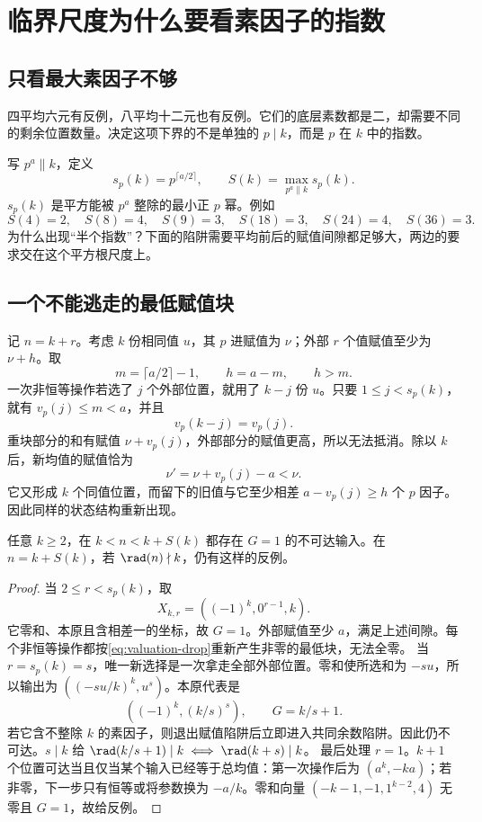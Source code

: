 \chapter{临界尺度为什么要看素因子的指数}\label{ch:lower}
\section{只看最大素因子不够}
四平均六元有反例，八平均十二元也有反例。它们的底层素数都是二，却需要不同的剩余位置数量。决定这项下界的不是单独的 $p\mid k$，而是 $p$ 在 $k$ 中的指数。

写 $p^a\parallel k$，定义
\begin{equation}\label{eq:S}
s_p(k)=p^{\lceil a/2\rceil},\qquad S(k)=\max_{p^a\parallel k}s_p(k).
\end{equation}
$s_p(k)$ 是平方能被 $p^a$ 整除的最小正 $p$ 幂。例如
\[
S(4)=2,\quad S(8)=4,\quad S(9)=3,\quad
S(18)=3,\quad S(24)=4,\quad S(36)=3.
\]
为什么出现“半个指数”？下面的陷阱需要平均前后的赋值间隙都足够大，两边的要求交在这个平方根尺度上。

\section{一个不能逃走的最低赋值块}
记 $n=k+r$。考虑 $k$ 份相同值 $u$，其 $p$ 进赋值为 $\nu$；外部 $r$ 个值赋值至少为 $\nu+h$。取
\[m=\lceil a/2\rceil-1,\qquad h=a-m,\qquad h>m.
\]
一次非恒等操作若选了 $j$ 个外部位置，就用了 $k-j$ 份 $u$。只要 $1\le j<s_p(k)$，就有 $v_p(j)\le m<a$，并且
\[v_p(k-j)=v_p(j).
\]
重块部分的和有赋值 $\nu+v_p(j)$，外部部分的赋值更高，所以无法抵消。除以 $k$ 后，新均值的赋值恰为
\begin{equation}\label{eq:valuation-drop}
\nu'=\nu+v_p(j)-a<\nu.
\end{equation}
它又形成 $k$ 个同值位置，而留下的旧值与它至少相差 $a-v_p(j)\ge h$ 个 $p$ 因子。因此同样的状态结构重新出现。

\begin{theorem}[严格下界]
任意 $k\ge2$，在 $k<n<k+S(k)$ 都存在 $G=1$ 的不可达输入。在 $n=k+S(k)$，若 $\rad(n)\nmid k$，仍有这样的反例。
\end{theorem}
\begin{proof}
当 $2\le r<s_p(k)$，取
\[X_{k,r}=((-1)^k,0^{r-1},k).
\]
它零和、本原且含相差一的坐标，故 $G=1$。外部赋值至少 $a$，满足上述间隙。每个非恒等操作都按\eqref{eq:valuation-drop}重新产生非零的最低块，无法全零。
当 $r=s_p(k)=s$，唯一新选择是一次拿走全部外部位置。零和使所选和为 $-su$，所以输出为 $((-su/k)^k,u^s)$。本原代表是
\[((-1)^k,(k/s)^s),\qquad G=k/s+1.
\]
若它含不整除 $k$ 的素因子，则退出赋值陷阱后立即进入共同余数陷阱。因此仍不可达。$s\mid k$ 给 $\rad(k/s+1)\mid k\iff\rad(k+s)\mid k$。
最后处理 $r=1$。$k+1$ 个位置可达当且仅当某个输入已经等于总均值：第一次操作后为 $(a^k,-ka)$；若非零，下一步只有恒等或将参数换为 $-a/k$。零和向量 $(-k-1,-1,1^{k-2},4)$ 无零且 $G=1$，故给反例。
\end{proof}

